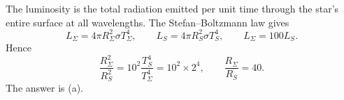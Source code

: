 The luminosity is the total radiation emitted per unit time through the
star's entire surface at all wavelengths. The Stefan--Boltzmann law gives
\[
L_\Sigma=4\pi R_\Sigma^2\sigma T_\Sigma^4,
\qquad L_S=4\pi R_S^2\sigma T_S^4,
\qquad L_\Sigma=100L_S.
\]
Hence
\[
\frac{R_\Sigma^2}{R_S^2}=10^2\frac{T_S^4}{T_\Sigma^4}=10^2\times2^4,
\qquad \frac{R_\Sigma}{R_S}=40.
\]
The answer is (a).
